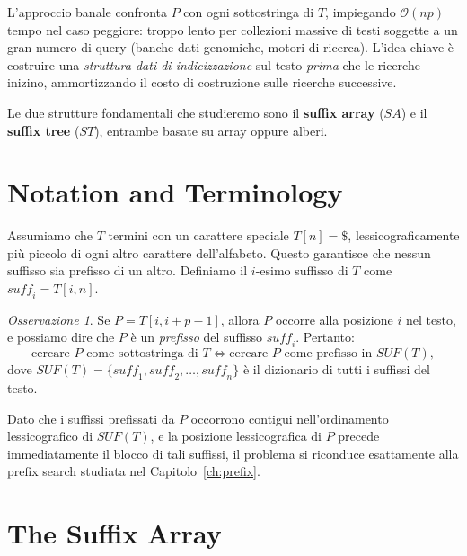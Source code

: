 \documentclass[12pt, a4paper, oneside]{book}
\theoremstyle{plain}
\theoremstyle{definition}
\theoremstyle{remark}
\newtheorem{osservazione}[teorema]{Osservazione}
\newcommand{\OO}[1]{\mathcal{O}\!\left(#1\right)}
\begin{document}
L'approccio banale confronta $P$ con ogni sottostringa di $T$, impiegando $\OO{np}$ tempo nel caso peggiore: troppo lento per collezioni massive di testi soggette a un gran numero di query (banche dati genomiche, motori di ricerca). L'idea chiave è costruire una \emph{struttura dati di indicizzazione} sul testo \emph{prima} che le ricerche inizino, ammortizzando il costo di costruzione sulle ricerche successive.

Le due strutture fondamentali che studieremo sono il \textbf{suffix array} ($SA$) e il \textbf{suffix tree} ($ST$), entrambe basate su array oppure alberi.

\section{Notation and Terminology}

Assumiamo che $T$ termini con un carattere speciale $T[n] = \$$, lessicograficamente più piccolo di ogni altro carattere dell'alfabeto. Questo garantisce che nessun suffisso sia prefisso di un altro. Definiamo il $i$-esimo suffisso di $T$ come $\mathit{suff}_i = T[i,n]$.

\begin{osservazione}
Se $P = T[i, i+p-1]$, allora $P$ occorre alla posizione $i$ nel testo, e possiamo dire che $P$ è un \emph{prefisso} del suffisso $\mathit{suff}_i$. Pertanto:
\[
\text{cercare } P \text{ come sottostringa di } T \iff \text{cercare } P \text{ come prefisso in } \mathit{SUF}(T),
\]
dove $\mathit{SUF}(T) = \{\mathit{suff}_1, \mathit{suff}_2, \ldots, \mathit{suff}_n\}$ è il dizionario di tutti i suffissi del testo.
\end{osservazione}

Dato che i suffissi prefissati da $P$ occorrono contigui nell'ordinamento lessicografico di $\mathit{SUF}(T)$, e la posizione lessicografica di $P$ precede immediatamente il blocco di tali suffissi, il problema si riconduce esattamente alla prefix search studiata nel Capitolo~\ref{ch:prefix}.

\section{The Suffix Array}
\label{sec:sa}
\end{document}
